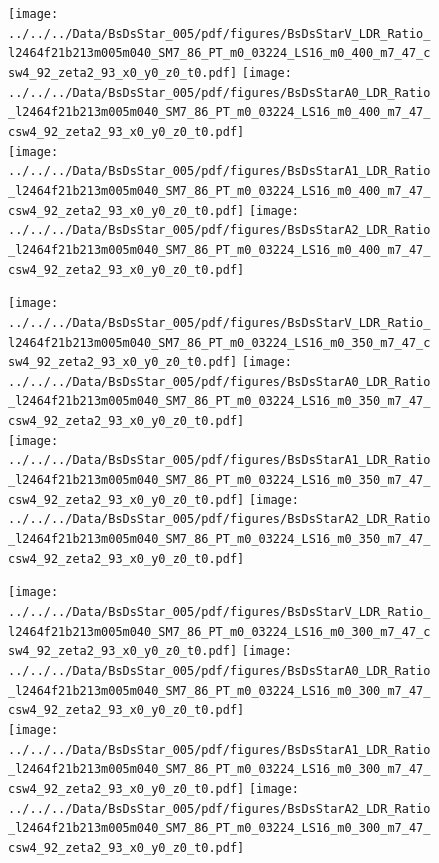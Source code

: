 \documentclass[a4paper,10pt]{article}
\begin{document}
\begin{figure}[p]
 \texttt{[image: ../../../Data/BsDsStar\_005/pdf/figures/BsDsStarV\_LDR\_Ratio\_l2464f21b213m005m040\_SM7\_86\_PT\_m0\_03224\_LS16\_m0\_400\_m7\_47\_csw4\_92\_zeta2\_93\_x0\_y0\_z0\_t0.pdf]}  
\texttt{[image: ../../../Data/BsDsStar\_005/pdf/figures/BsDsStarA0\_LDR\_Ratio\_l2464f21b213m005m040\_SM7\_86\_PT\_m0\_03224\_LS16\_m0\_400\_m7\_47\_csw4\_92\_zeta2\_93\_x0\_y0\_z0\_t0.pdf]} \\ 
\texttt{[image: ../../../Data/BsDsStar\_005/pdf/figures/BsDsStarA1\_LDR\_Ratio\_l2464f21b213m005m040\_SM7\_86\_PT\_m0\_03224\_LS16\_m0\_400\_m7\_47\_csw4\_92\_zeta2\_93\_x0\_y0\_z0\_t0.pdf]}  
\texttt{[image: ../../../Data/BsDsStar\_005/pdf/figures/BsDsStarA2\_LDR\_Ratio\_l2464f21b213m005m040\_SM7\_86\_PT\_m0\_03224\_LS16\_m0\_400\_m7\_47\_csw4\_92\_zeta2\_93\_x0\_y0\_z0\_t0.pdf]} \\ 
\end{figure} 
\clearpage

\begin{figure}[p]
 \texttt{[image: ../../../Data/BsDsStar\_005/pdf/figures/BsDsStarV\_LDR\_Ratio\_l2464f21b213m005m040\_SM7\_86\_PT\_m0\_03224\_LS16\_m0\_350\_m7\_47\_csw4\_92\_zeta2\_93\_x0\_y0\_z0\_t0.pdf]}  
\texttt{[image: ../../../Data/BsDsStar\_005/pdf/figures/BsDsStarA0\_LDR\_Ratio\_l2464f21b213m005m040\_SM7\_86\_PT\_m0\_03224\_LS16\_m0\_350\_m7\_47\_csw4\_92\_zeta2\_93\_x0\_y0\_z0\_t0.pdf]} \\ 
\texttt{[image: ../../../Data/BsDsStar\_005/pdf/figures/BsDsStarA1\_LDR\_Ratio\_l2464f21b213m005m040\_SM7\_86\_PT\_m0\_03224\_LS16\_m0\_350\_m7\_47\_csw4\_92\_zeta2\_93\_x0\_y0\_z0\_t0.pdf]}  
\texttt{[image: ../../../Data/BsDsStar\_005/pdf/figures/BsDsStarA2\_LDR\_Ratio\_l2464f21b213m005m040\_SM7\_86\_PT\_m0\_03224\_LS16\_m0\_350\_m7\_47\_csw4\_92\_zeta2\_93\_x0\_y0\_z0\_t0.pdf]} \\ 
\end{figure} 
\clearpage

\begin{figure}[p]
 \texttt{[image: ../../../Data/BsDsStar\_005/pdf/figures/BsDsStarV\_LDR\_Ratio\_l2464f21b213m005m040\_SM7\_86\_PT\_m0\_03224\_LS16\_m0\_300\_m7\_47\_csw4\_92\_zeta2\_93\_x0\_y0\_z0\_t0.pdf]}  
\texttt{[image: ../../../Data/BsDsStar\_005/pdf/figures/BsDsStarA0\_LDR\_Ratio\_l2464f21b213m005m040\_SM7\_86\_PT\_m0\_03224\_LS16\_m0\_300\_m7\_47\_csw4\_92\_zeta2\_93\_x0\_y0\_z0\_t0.pdf]} \\ 
\texttt{[image: ../../../Data/BsDsStar\_005/pdf/figures/BsDsStarA1\_LDR\_Ratio\_l2464f21b213m005m040\_SM7\_86\_PT\_m0\_03224\_LS16\_m0\_300\_m7\_47\_csw4\_92\_zeta2\_93\_x0\_y0\_z0\_t0.pdf]}  
\texttt{[image: ../../../Data/BsDsStar\_005/pdf/figures/BsDsStarA2\_LDR\_Ratio\_l2464f21b213m005m040\_SM7\_86\_PT\_m0\_03224\_LS16\_m0\_300\_m7\_47\_csw4\_92\_zeta2\_93\_x0\_y0\_z0\_t0.pdf]} \\ 
\end{figure} 
\clearpage
\end{document}
